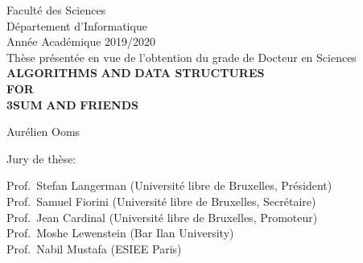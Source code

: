 \vspace*{\fill}
\begin{center}
Facult\'{e} des Sciences\\[1.5pt]
D\'{e}partement d'Informatique \\[1.5pt]
Ann\'{e}e Acad\'{e}mique 2019/2020 \\[1cm]
Th\`{e}se pr\'{e}sent\'{e}e en vue de l'obtention du grade de Docteur en Sciences \\[2cm]
{\fontsize{16}{24}\selectfont\bfseries{}ALGORITHMS}
{\fontsize{12}{24}\selectfont\bfseries{}AND}
{\fontsize{16}{24}\selectfont\bfseries{}DATA STRUCTURES}\\[12pt]
{\fontsize{12}{24}\selectfont\bfseries{}FOR}\\[12pt]
{\fontsize{16}{24}\selectfont\bfseries{}3SUM}
{\fontsize{12}{24}\selectfont\bfseries{}AND}
{\fontsize{16}{24}\selectfont\bfseries{}FRIENDS}
\end{center}

\begin{center}
\vspace{1cm}
{\large Aurélien Ooms} \\[2cm]
\end{center}

\begin{center}
	Jury de th\`{e}se:
\end{center}
\begin{flushleft}
Prof.~Stefan Langerman (Université libre de Bruxelles, Président) \\
Prof.~Samuel Fiorini (Université libre de Bruxelles, Secrétaire) \\
Prof.~Jean Cardinal (Université libre de Bruxelles, Promoteur) \\
Prof.~Moshe Lewenstein (Bar Ilan University) \\
Prof.~Nabil Mustafa (ESIEE Paris)
\end{flushleft}
\vspace*{\fill}
